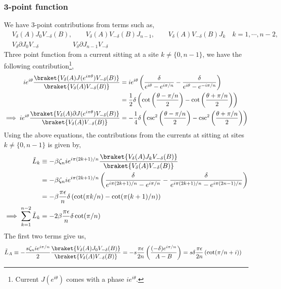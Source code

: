 \documentclass[11pt]{article}
\newcommand{\ep}{\epsilon}
\newcommand{\p}{\partial}
\newcommand{\lb}{\left(}
\newcommand{\rb}{\right)}
\begin{document}
\subsubsection{3-point function}
We have 3-point contributions from terms such as,
\begin{align}
    &V_\delta(A) J_0 V_{-\delta}(B) , \qquad V_\delta(A)  V_{-\delta}(B) J_{n-1}, \qquad V_\delta(A)  V_{-\delta}(B) J_k \quad k = 1,\cdots,n-2, \\
   &  V_\delta \p J_0 V_{-\delta} \qquad \qquad \quad  V_\delta \p J_{n-1}V_{-\delta} 
\end{align}
Three point function from a current sitting at a site $k \neq \{0,n-1\}$, we have the following contribution\footnote{Current $J(e^{i\theta})$ comes with a phase $ie^{i\theta}$.},
\begin{align}
    i e^{i\theta} \frac{\braket{V_\delta(A)J(e^{i\pi\theta})V_{-\delta}(B)}}{\braket{V_{\delta}(A)V_{-\delta}(B)}} &=i  e^{i\theta} \lb\frac{\delta}{e^{i\theta} - e^{i\pi/n} }- \frac{\delta}{e^{i\theta} - e^{-i\pi/n} } \rb \\
    &= \frac{1}{2}\delta \lb \cot\lb\frac{\theta - \pi/n}{2} \rb -\cot\lb\frac{\theta +\pi/n}{2} \rb \rb \\
    \implies i e^{i\theta} \frac{\braket{V_\delta(A)\p J(e^{i\pi\theta})V_{-\delta}(B)}}{\braket{V_{\delta}(A)V_{-\delta}(B)}} &= -\frac{1}{4}\delta \lb \csc^2 \lb \frac{\theta - \pi/n}{2}\rb  - \csc^2\lb\frac{\theta + \pi/n}{2}\rb\rb
\end{align}
Using the above equations, the  contributions from the currents at sitting at sites $k \neq \{0,n-1\}$ is given by,
\begin{align}
    \tilde{L}_k &\equiv -\beta \zeta_n i e^{i\pi (2k+1)/n} \frac{\braket{V_\delta(A)J_kV_{-\delta}(B)}}{\braket{V_{\delta}(A)V_{-\delta}(B)}}\\
    &=-\beta \zeta_n i e^{i\pi (2k+1)/n} \lb \frac{\delta }{e^{i\pi(2k+1)/n } - e^{i\pi/n} } - \frac{\delta }{e^{i\pi(2k+1)/n } - e^{i\pi(2n-1)/n} } \rb \\
    &= -\beta \frac{\pi \ep}{n}\delta \lb \cot(\pi k/n) - \cot(\pi (k+1)/n) \rb
    \\
    \implies \sum_{k=1}^{n-2}\tilde{L}_k &= -2\beta \frac{\pi \ep}{n} \delta \cot(\pi/n)
\end{align}
The first two terms give us,
\begin{align}
    \tilde{L}_A &\equiv -\frac{s\zeta_ni e^{i\pi/n}}{2}\frac{\braket{V_\delta(A)J_0V_{-\delta}(B)}}{\braket{V_{\delta}(A)V_{-\delta}(B)}} =-s\frac{\pi \ep}{2n} \lb \frac{(-\delta) e^{i\pi /n}}{A-B} \rb = s\delta \frac{\pi \ep}{2n}\lb\cot(\pi/n + i)\rb 
\end{align}
\end{document}
